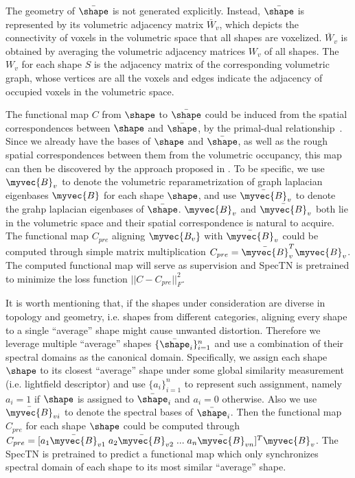 The geometry of $\bar{\shape}$ is not generated explicitly. Instead, $\bar{\shape}$ is represented by its volumetric adjacency matrix $\bar{W}_v$, which depicts the connectivity of voxels in the volumetric space that all shapes are voxelized. $\bar{W}_v$ is obtained by averaging the volumetric adjacency matrices $W_v$ of all shapes. The $W_v$ for each shape $S$ is the adjacency matrix of the corresponding volumetric graph, whose vertices are all the voxels and edges indicate the adjacency of occupied voxels in the volumetric space.

The functional map $C$ from $\shape$ to $\bar{\shape}$ could be induced from the spatial correspondences between $\shape$ and $\bar{\shape}$, by the primal-dual relationship~\cite{ovsjanikov2012functional}. Since we already have the bases of $\shape$ and $\bar{\shape}$, as well as the rough spatial correspondences between them from the volumetric occupancy, this map can then be discovered by the approach proposed in \cite{ovsjanikov2012functional}. To be specific, we use $\myvec{B}_v$ to denote the volumetric reparametrization of graph laplacian eigenbases $\myvec{B}$ for each shape $\shape$, and use $\bar{\myvec{B}}_v$ to denote the grahp laplacian eigenbases of $\bar{\shape}$. $\myvec{B}_v$ and $\bar{\myvec{B}}_v$ both lie in the volumetric space and their spatial correspondence is natural to acquire. The functional map $C_{pre}$ aligning $\myvec{B_v}$ with $\bar{\myvec{B}}_v$ could be computed through simple matrix multiplication $C_{pre}=\bar{\myvec{B}}_v^T\myvec{B}_v$. The computed functional map will serve as supervision and SpecTN is pretrained to minimize the loss function $||C-C_{pre}||_F^2$.

It is worth mentioning that, if the shapes under consideration are diverse in topology and geometry, i.e. shapes from different categories, aligning every shape to a single ``average'' shape might cause unwanted distortion. Therefore we leverage multiple ``average'' shapes $\{\bar{\shape}_i\}_{i=1}^{n}$ and use a combination of their spectral domains as the canonical domain. Specifically, we assign each shape $\shape$ to its closest ``average'' shape under some global similarity measurement (i.e. lightfield descriptor) and use $\{a_i\}_{i=1}^n$ to represent such assignment, namely $a_i=1$ if $\shape$ is assigned to $\bar{\shape}_i$ and $a_i=0$ otherwise. Also we use $\bar{\myvec{B}}_{vi}$ to denote the spectral bases of $\bar{\shape}_i$. Then the functional map $C_{pre}$ for each shape $\shape$ could be computed through $C_{pre}=[a_1\bar{\myvec{B}}_{v1} \;a_2\bar{\myvec{B}}_{v2}\; ...\; a_n\bar{\myvec{B}}_{vn}]^T\myvec{B}_v$. The SpecTN is pretrained to predict a functional map which only synchronizes spectral domain of each shape to its most similar ``average'' shape.

